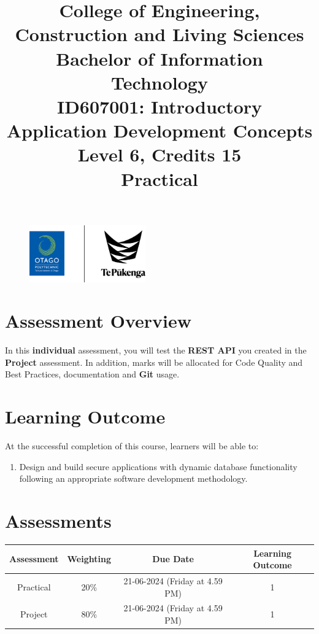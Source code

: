 \documentclass{article}
\author{}
\begin{document}
\begin{figure}
    \centering
    \includegraphics[width=50mm]{../img/logo.png}
\end{figure}

\title{College of Engineering, Construction and Living Sciences\\Bachelor of Information Technology\\ID607001: Introductory Application Development Concepts\\Level 6, Credits 15\\\textbf{Practical}}
\date{}
\maketitle

\section*{Assessment Overview}
In this \textbf{individual} assessment, you will test the \textbf{REST API} you created in the \textbf{Project} assessment. In addition, marks will be allocated for Code Quality and Best Practices, documentation and \textbf{Git} usage.  

\section*{Learning Outcome}
At the successful completion of this course, learners will be able to:
\begin{enumerate}
	\item Design and build secure applications with dynamic database functionality following an appropriate software development methodology.
\end{enumerate}

\section*{Assessments}
\renewcommand{\arraystretch}{1.5}
\begin{tabular}{|c|c|c|c|}
	\hline
	\textbf{Assessment}                                 & \textbf{Weighting} & \textbf{Due Date}            & \textbf{Learning Outcome} \\ \hline
	\small Practical & \small 20\%        & \small 21-06-2024 (Friday at 4.59 PM)   & \small 1                   \\ \hline
	\small Project                 & \small 80\%        & \small 21-06-2024 (Friday at 4.59 PM) \small  & \small 1                   \\ \hline
\end{tabular}
\end{document}
